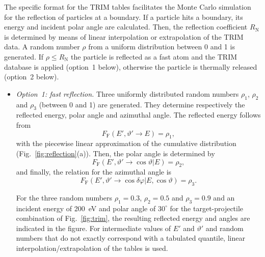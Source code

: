 The specific format for the TRIM tables facilitates the Monte Carlo simulation for the reflection of particles at a boundary. If a particle hits a boundary, its energy and incident polar angle are calculated. Then, the reflection coefficient $R_{\mathrm{N}}$ is determined by means of linear interpolation or extrapolation of the TRIM data. A random number $\rho$ from a uniform distribution between 0 and 1 is generated. If $\rho \leq R_{\mathrm{N}}$ the particle is reflected as a fast atom and the TRIM database is applied (option~1 below), otherwise the particle is thermally released (option~2 below).

\begin{itemize}
	\item \emph{Option~1: fast reflection.} Three uniformly distributed random numbers $\rho_{1}$, $\rho_{2}$ and $\rho_{3}$ (between 0 and 1) are generated. They determine respectively the reflected energy, polar angle and azimuthal angle. The reflected energy follows from
	\begin{equation}
	F_{\mathrm{F}}(E',\vartheta' \rightarrow E ) = \rho_{1},
	\end{equation}
	with the piecewise linear approximation of the cumulative distribution (Fig.~\ref{fig:reflection}(a)). Then, the polar angle is determined by
	\begin{equation}
	F_{\mathrm{F}}(E',\vartheta' \rightarrow \cos \vartheta | E) = \rho_{2},
	\end{equation}
	and finally, the relation for the azimuthal angle is
	\begin{equation}
	F_{\mathrm{F}}(E',\vartheta' \rightarrow \cos \delta \varphi | E,\cos \vartheta ) = \rho_{3}.
	\end{equation}
	
	For the three random numbers $\rho_{1} = 0.3$, $\rho_{2} = 0.5$ and $\rho_{3} = 0.9$ and an incident energy of 200~eV and polar angle of $30^{\circ}$ for the target-projectile combination of Fig.~\ref{fig:trim}, the resulting reflected energy and angles are indicated in the figure. For intermediate values of $E'$ and $\vartheta'$ and random numbers that do not exactly correspond with a tabulated quantile, linear interpolation/extrapolation of the tables is used.
	

\end{itemize}
